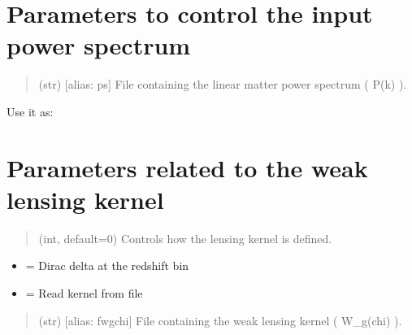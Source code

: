 \documentclass[letterpaper,10pt,english]{sphinxmanual}
\begin{document}
\section{Parameters to control the input power spectrum}
\label{\detokenize{params:parameters-to-control-the-input-power-spectrum}}\begin{quote}\begin{description}
\sphinxAtStartPar
(str) {[}alias: ps{]} File containing the linear matter power spectrum ( P(k) ).

\end{description}\end{quote}

\sphinxAtStartPar
Use it as:

\begin{sphinxVerbatim}[commandchars=\\\{\}]
\end{sphinxVerbatim}


\section{Parameters related to the weak lensing kernel}
\label{\detokenize{params:parameters-related-to-the-weak-lensing-kernel}}\begin{quote}\begin{description}
\sphinxAtStartPar
(int, default=0) Controls how the lensing kernel is defined.

\end{description}\end{quote}
\begin{itemize}
\item {} 
\sphinxAtStartPar
{} = Dirac delta at the redshift bin

\item {} 
\sphinxAtStartPar
{} = Read kernel from file

\end{itemize}
\begin{quote}\begin{description}
\sphinxAtStartPar
(str) {[}alias: fwgchi{]} File containing the weak lensing kernel ( W\_g(chi) ).

\end{description}\end{quote}
\end{document}
